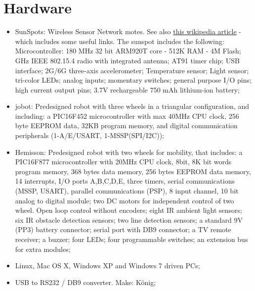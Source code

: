 \documentclass[a4paper, 12pt, titlepage]{article}
\begin{document}
\section{Hardware}
\begin{itemize}
    \item SunSpots: Wireless Sensor Network motes. See also 
    \href{http://en.wikipedia.org/wiki/Sun_SPOT}
        {this wikipedia article} - which includes some useful links. The sunspot
        includes the following:
        \subitem Microcontroller: 180 MHz 32 bit ARM920T core - 512K RAM - 4M
        Flash;
         GHz IEEE 802.15.4 radio with integrated antenna;
        \subitem AT91 timer chip;
        \subitem USB interface;
        \subitem 2G/6G three-axis accelerometer;
        \subitem Temperature sensor;
        \subitem Light sensor;
         tri-color LEDs;
         analog inputs;
         momentary switches;
         general purpose I/O pins;
         high current output pins;
        \subitem 3.7V rechargeable 750 mAh lithium-ion battery;
    \item jobot: Predesigned robot with three wheels in a triangular
    configuration, and including:
        \subitem a PIC16F452 microcontroller with max 40MHz CPU clock, 256 byte
        EEPROM data, 32KB program memory, and digital communication peripherals
        (1-A/E/USART, 1-MSSP(SPI/I2C));
    \item Hemisson: Predesigned robot with two wheels for mobility, that includes:
        \subitem a PIC16F877 microcontroller with 20MHz CPU clock, 8bit,
        8K bit words program memory, 368 bytes data memory, 256 bytes
        EEPROM data memory, 14 interrupts, I/O ports A,B,C,D,E, three timers,
        serial communications (MSSP, USART), parallel communications (PSP), 8
        input channel, 10 bit analog to digital module;
        \subitem two DC motors for independent control of two wheel. Open loop
        control without encoders;
        \subitem eight IR ambient light sensors;
        \subitem six IR obstacle detection sensors;
        \subitem two line detection sensors;
        \subitem a standard 9V (PP3) battery connector;
        \subitem serial port with DB9 connector;
        \subitem a TV remote receiver;
        \subitem a buzzer;
        \subitem four LEDs;
        \subitem four programmable switches;
        \subitem an extension bus for extra modules;
    \item Linux, Mac OS X, Windows XP and Windows 7 driven PCs;
    \item USB to RS232 / DB9 converter. Make: K\"onig;
        

\end{itemize}
\end{document}
